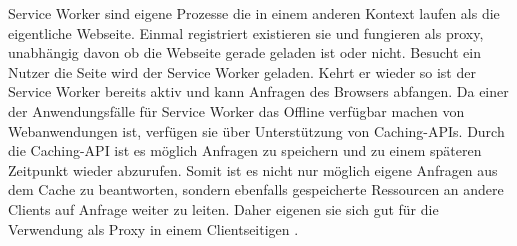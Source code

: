 Service Worker sind eigene Prozesse die in einem anderen Kontext laufen als die eigentliche Webseite. Einmal registriert existieren sie und fungieren als proxy, unabhängig davon ob die Webseite gerade geladen ist oder nicht. Besucht ein Nutzer die Seite wird der Service Worker geladen. Kehrt er wieder so ist der Service Worker bereits aktiv und kann Anfragen des Browsers abfangen. Da einer der Anwendungsfälle für Service Worker das Offline verfügbar machen von Webanwendungen ist, verfügen sie über Unterstützung von Caching-APIs. Durch die Caching-API ist es möglich Anfragen zu speichern und zu einem späteren Zeitpunkt wieder abzurufen. Somit ist es nicht nur möglich eigene Anfragen aus dem Cache zu beantworten, sondern ebenfalls gespeicherte Ressourcen an andere Clients auf Anfrage weiter zu leiten. Daher eigenen sie sich gut für die Verwendung als Proxy in einem Clientseitigen \cdn.   


